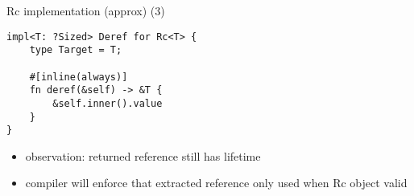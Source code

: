 \begin{frame}[fragile,label=rcImplC]{Rc implementation (approx) (3)}
\begin{verbatim}
impl<T: ?Sized> Deref for Rc<T> {
    type Target = T;

    #[inline(always)]
    fn deref(&self) -> &T {
        &self.inner().value
    }
}
\end{verbatim}
\begin{itemize}
\item observation: returned reference still has lifetime
\item compiler will enforce that extracted reference only used when Rc object valid
\end{itemize}
\end{frame}


